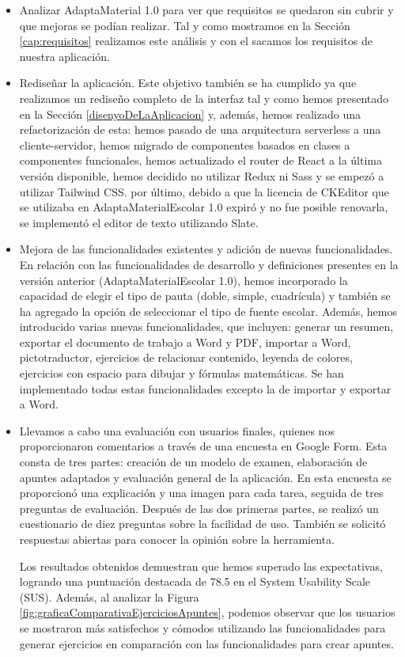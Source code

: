 \begin{itemize}
    \item Analizar AdaptaMaterial 1.0 para ver que requisitos se quedaron sin cubrir y que mejoras se podían realizar. Tal y como mostramos en la Sección \ref{cap:requisitos} realizamos este análisis y con el sacamos los requisitos de nuestra aplicación.
    \item Rediseñar la aplicación. Este objetivo también se ha cumplido ya que realizamos un rediseño completo de la interfaz tal y como hemos presentado en la Sección \ref{disenyoDeLaAplicacion} y, además, hemos realizado una refactorización de esta: hemos pasado de una arquitectura serverless a una cliente-servidor, hemos migrado de componentes basados en clases a componentes funcionales, hemos actualizado el router de React a la última versión disponible, hemos decidido no utilizar Redux ni Sass y se empezó a utilizar Tailwind CSS. por último, debido a que la licencia de CKEditor que se utilizaba en AdaptaMaterialEscolar 1.0 expiró y no fue posible renovarla, se implementó el editor de texto utilizando Slate.
    \item Mejora de las funcionalidades existentes y adición de nuevas funcionalidades. En relación con las funcionalidades de desarrollo y definiciones presentes en la versión anterior (AdaptaMaterialEscolar 1.0), hemos incorporado la capacidad de elegir el tipo de pauta (doble, simple, cuadrícula) y también se ha agregado la opción de seleccionar el tipo de fuente escolar. Además, hemos introducido varias nuevas funcionalidades, que incluyen: generar un resumen, exportar el documento de trabajo a Word y PDF, importar a Word, pictotraductor, ejercicios de relacionar contenido, leyenda de colores, ejercicios con espacio para dibujar y fórmulas matemáticas. Se han implementado todas estas funcionalidades excepto la de importar y exportar a Word.
    \item Llevamos a cabo una evaluación con usuarios finales, quienes nos proporcionaron comentarios a través de una encuesta en Google Form. Esta consta de tres partes: creación de un modelo de examen, elaboración de apuntes adaptados y evaluación general de la aplicación. En esta encuesta se proporcionó una explicación y una imagen para cada tarea, seguida de tres preguntas de evaluación. Después de las dos primeras partes, se realizó un cuestionario de diez preguntas sobre la facilidad de uso. También se solicitó respuestas abiertas para conocer la opinión sobre la herramienta.

    Los resultados obtenidos demuestran que hemos superado las expectativas, logrando una puntuación destacada de 78.5 en el System Usability Scale (SUS). Además, al analizar la Figura \ref{fig:graficaComparativaEjerciciosApuntes}, podemos observar que los usuarios se mostraron más satisfechos y cómodos utilizando las funcionalidades para generar ejercicios en comparación con las funcionalidades para crear apuntes.
\end{itemize}

